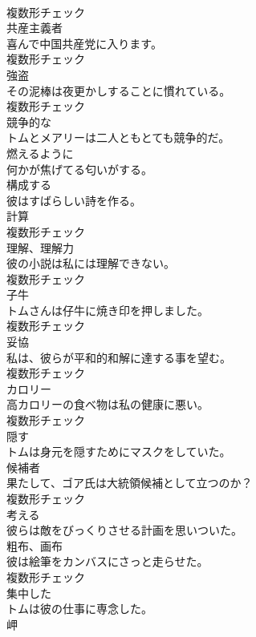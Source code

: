 \documentclass[8pt]{extreport}
\begin{document}
\begin{CJK}{UTF8}{min}
\\	複数形チェック
\\	[名詞]	共産主義者	
\\	喜んで中国共産党に入ります。	
\\	複数形チェック
\\	[名詞]	強盗	
\\	その泥棒は夜更かしすることに慣れている。	
\\	複数形チェック
\\	[形容詞]	競争的な	
\\	トムとメアリーは二人ともとても競争的だ。	
\\	[形容詞]	燃えるように	
\\	何かが焦げてる匂いがする。	
\\	[動詞]	構成する	
\\	彼はすばらしい詩を作る。	
\\	[名詞]	計算	
\\	複数形チェック
\\	[名詞]	理解、理解力	
\\	彼の小説は私には理解できない。	
\\	複数形チェック
\\	[名詞]	子牛	
\\	トムさんは仔牛に焼き印を押しました。	
\\	複数形チェック
\\	[名詞]	妥協	
\\	私は、彼らが平和的和解に達する事を望む。	
\\	複数形チェック
\\	[名詞]	カロリー	
\\	高カロリーの食べ物は私の健康に悪い。	
\\	複数形チェック
\\	[動詞]	隠す	
\\	トムは身元を隠すためにマスクをしていた。	
\\	[名詞]	候補者	
\\	果たして、ゴア氏は大統領候補として立つのか？	
\\	複数形チェック
\\	[動詞]	考える	
\\	彼らは敵をびっくりさせる計画を思いついた。	
\\	[名詞]	粗布、画布	
\\	彼は絵筆をカンバスにさっと走らせた。	
\\	複数形チェック
\\	[形容詞]	集中した	
\\	トムは彼の仕事に専念した。	
\\	[名詞]	岬	

\end{CJK}
\end{document}
